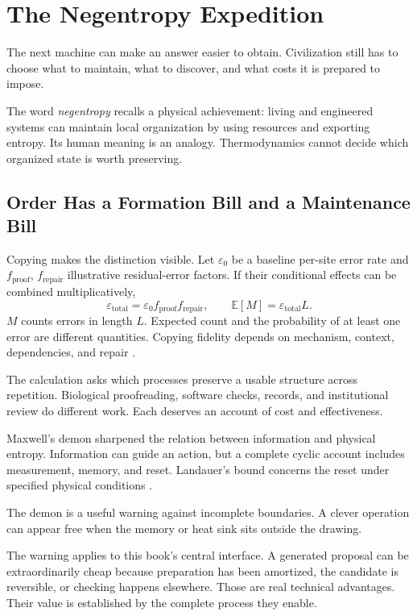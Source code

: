 \section{The Negentropy Expedition}

The next machine can make an answer easier to obtain. Civilization still has to choose what to maintain, what to discover, and what costs it is prepared to impose.

The word \emph{negentropy} recalls a physical achievement: living and engineered systems can maintain local organization by using resources and exporting entropy. Its human meaning is an analogy. Thermodynamics cannot decide which organized state is worth preserving.

\subsection{Order Has a Formation Bill and a Maintenance Bill}

Copying makes the distinction visible. Let $\varepsilon_0$ be a baseline per-site error rate and $f_{\mathrm{proof}}$, $f_{\mathrm{repair}}$ illustrative residual-error factors. If their conditional effects can be combined multiplicatively,
\begin{equation}
 \varepsilon_{\mathrm{total}}
 =\varepsilon_0f_{\mathrm{proof}}f_{\mathrm{repair}},
 \qquad
 \mathbb E[M]=\varepsilon_{\mathrm{total}}L.
\end{equation}
$M$ counts errors in length $L$. Expected count and the probability of at least one error are different quantities. Copying fidelity depends on mechanism, context, dependencies, and repair \cite{kunkel2000dna}.

The calculation asks which processes preserve a usable structure across repetition. Biological proofreading, software checks, records, and institutional review do different work. Each deserves an account of cost and effectiveness.

Maxwell's demon sharpened the relation between information and physical entropy. Information can guide an action, but a complete cyclic account includes measurement, memory, and reset. Landauer's bound concerns the reset under specified physical conditions \cite{landauer1961,bennett1982thermodynamics}.

The demon is a useful warning against incomplete boundaries. A clever operation can appear free when the memory or heat sink sits outside the drawing.

The warning applies to this book's central interface. A generated proposal can be extraordinarily cheap because preparation has been amortized, the candidate is reversible, or checking happens elsewhere. Those are real technical advantages. Their value is established by the complete process they enable.

